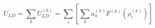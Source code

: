 \documentclass[12pt]{article}
\begin{document}
$$
U_{LD} = \sum_k U_{LD}^{(k)} = \sum_i \left[ \sum_k a_\alpha^{(k)} F^{(k)} \left(\rho_i^{(k)}\right) \right] 
$$
\end{document}
